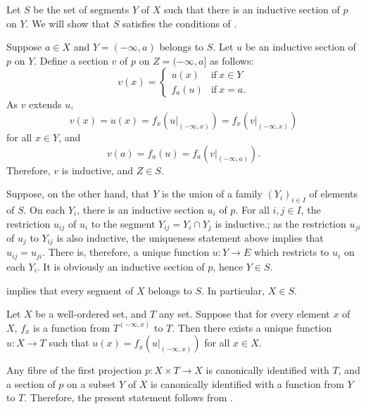 \documentclass{article}
\begin{document}
Let \(S\) be the set of segments \(Y\) of \(X\) such that there is an
inductive section of \(p\) on \(Y\).  We will show that \(S\)
satisfies the conditions of .

Suppose \(a \in X\) and \(Y = (-\infty, a)\) belongs to \(S\).  Let
\(u\) be an inductive section of \(p\) on \(Y\).  Define a section
\(v\) of \(p\) on \(Z = (-\infty, a]\) as follows:
\begin{displaymath}
  v(x) =
  \begin{cases}
    u(x) & \text{if} ~ x \in Y \\
    f_a(u) & \text{if} ~ x = a.
  \end{cases}
\end{displaymath}
As \(v\) extends \(u\),
\begin{displaymath}
  v(x) = u(x) = f_x(u \vert_{(-\infty, x)}) =
  f_x(v \vert_{(-\infty, x)})
\end{displaymath}
for all \(x \in Y\), and
\begin{displaymath}
  v(a) = f_a(u) = f_a(v \vert_{(-\infty, a)}).
\end{displaymath}
Therefore, \(v\) is inductive, and \(Z \in S\).

Suppose, on the other hand, that \(Y\) is the union of a family
\((Y_i)_{i \in I}\) of elements of \(S\).  On each \(Y_i\), there is
an inductive section \(u_i\) of \(p\).  For all \(i, j \in I\), the
restriction \(u_{ij}\) of \(u_i\) to the segment
\(Y_{ij} = Y_i \cap Y_j\) is inductive.; as the restriction \(u_{ji}\)
of \(u_j\) to \(Y_{ij}\) is also inductive, the uniqueness statement
above implies that \(u_{ij} = u_{ji}\).  There is, therefore, a unique
function \(u : Y \to E\) which restricts to \(u_i\) on each \(Y_i\).
It is obviously an inductive section of \(p\), hence \(Y \in S\).

 implies that every segment of \(X\) belongs to
\(S\).  In particular, \(X \in S\).

\begin{theorem}
  \label{thm:5kg5ewo1}
  Let \(X\) be a well-ordered set, and \(T\) any set.  Suppose that
  for every element \(x\) of \(X\), \(f_x\) is a function from
  \(T^{(-\infty, x)}\) to \(T\).  Then there exists a unique function
  \(u : X \to T\) such that \(u(x) = f_x(u \vert_{(-\infty, x)})\) for
  all \(x \in X\).
\end{theorem}

Any fibre of the first projection \(p : X \times T \to X\) is
canonically identified with \(T\), and a section of \(p\) on a subset
\(Y\) of \(X\) is canonically identified with a function from \(Y\) to
\(T\).  Therefore, the present statement follows from
.
\end{document}
